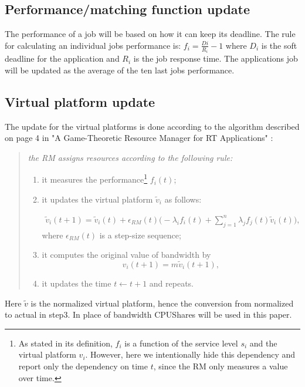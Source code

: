 \documentclass[nobiblatex]{LTHthesis}
\begin{document}
\subsection{Performance/matching function update}
The performance of a job will be based on how it can keep its deadline. The rule for calculating an individual jobs performance is:
$f_{i}=\frac{D{i}}{R_{i}}-1$ where $D_{i}$ is the soft deadline for the application and $R_{i}$ is the job response time.
The applications job will be updated as the average of the ten last jobs performance.

\subsection{Virtual platform update}

The update for the virtual platforms is done according to the algorithm described on page 4 in "A Game-Theoretic Resource Manager for RT Applications" \cite{gtrm}:


\begin{quotation}
\em
	the RM assigns resources according to
	the following rule:
	\begin{enumerate}

	\item it measures the performance\footnote{As stated in its definition, $f_i$ is a function of the service level $s_i$ and the virtual platform $v_i$. However, here we intentionally hide this dependency and report only the dependency on time $t$, since the RM only measures a value over time.} $f_i(t)$;  
	\item it updates the virtual platform $\tilde{v}_{i}$ as follows:

		\begin{multline}
		  \tilde{v}_i(t+1) =\tilde{v}_i(t) + \epsilon_{ RM}(t)\Big(- \lambda_i f_i(t) + \sum_{j=1}^n \lambda_j f_j(t) \tilde{v}_i(t)\Big),
		  \label{eq:RecursionForResources}
		\end{multline}
		  where $\epsilon_{ RM}(t)$ is a step-size sequence;
	\item it computes the original value of bandwidth by $$v_i(t+1) = m \tilde{v}_i(t+1),$$
	\item it updates the time $t\leftarrow t+1$ and repeats.
	\end{enumerate}
	
	
\end{quotation}

Here $\tilde{v}$ is the normalized virtual platform, hence the conversion from normalized to actual in step3. In place of bandwidth CPUShares will be used in this paper.
\end{document}
